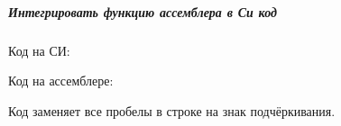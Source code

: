 \subparagraph{Интегрировать функцию ассемблера в Си код}

Код на СИ:

Код на ассемблере:

Код заменяет все пробелы в строке на знак подчёркивания.